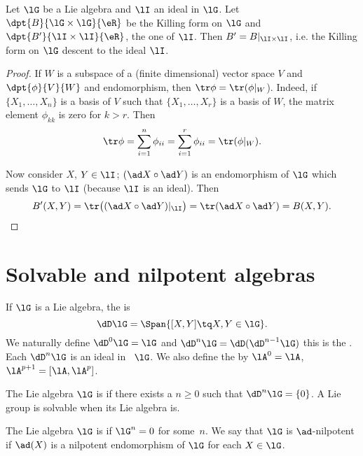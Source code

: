 \begin{lemma}  
Let $\lG$ be a Lie algebra and $\lI$ an ideal in $\lG$. Let $\dpt{B}{\lG\times\lG}{\eR}$ be the Killing form on $\lG$ and $\dpt{B'}{\lI\times\lI}{\eR}$, the one of $\lI$. Then $B'=B|_{\lI\times\lI}$, i.e. the Killing form on $\lG$ descent to the ideal $\lI$.
\label{lem:Killing_descent_ideal}
\end{lemma}

\begin{proof}
If $W$ is a subspace of a (finite dimensional) vector space $V$ and $\dpt{\phi}{V}{W}$ and endomorphism, then $\tr\phi=\tr(\phi|_W$). Indeed, if $\{X_1,\ldots,X_n\}$ is a basis of $V$ such that $\{X_1,\ldots,X_r\}$ is a basis of $W$, the matrix element $\phi_{kk}$ is zero for $k>r$. Then 
\[
  \tr\phi=\sum_{i=1}^{n}\phi_{ii}=\sum_{i=1}^r\phi_{ii}=\tr(\phi|_W).
\]

Now consider $X$, $Y\in\lI$; $(\ad X\circ\ad Y)$ is an endomorphism of $\lG$ which sends $\lG$ to $\lI$ (because $\lI$ is an ideal). Then
\[
B'(X,Y)=\tr\big( (\ad X\circ\ad Y)|_{\lI} \big)=\tr(\ad X\circ\ad Y)=B(X,Y).
\]
\end{proof}

\section{Solvable and nilpotent algebras}

If $\lG$ is a Lie algebra, the  is 
\[
   \dD\lG=\Span\{[X,Y]\tq X,Y\in\lG\}.
\]
We naturally define $\dD^0\lG=\lG$ and $\dD^n\lG=\dD(\dD^{n-1}\lG)$ this is the . Each $\dD^n\lG$ is an ideal in~ $\lG$. We also define the  by $\lA^0=\lA$, $\lA^{p+1}=[\lA,\lA^p]$.

\begin{definition}
The Lie algebra $\lG$ is  if there exists a $n\geq 0$ such that $\dD^n\lG=\{0\}$. A Lie group is solvable when its Lie algebra is.  

    The Lie algebra  \( \lG\) is  if \( \lG^n=0\) for some~\( n\). We say that \( \lG\) is \( \ad\)-nilpotent if \( \ad(X)\) is a nilpotent endomorphism of \( \lG\) for each \( X\in\lG\).
\end{definition}

